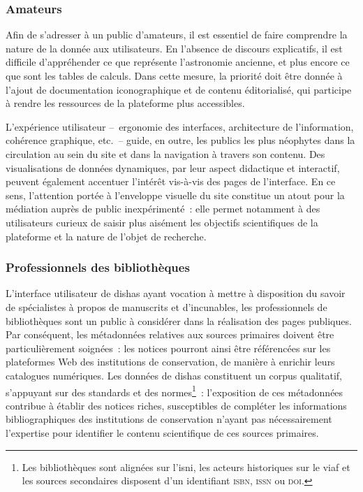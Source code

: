 \documentclass[a4paper,12pt,twoside]{book}
\newcommand{\dishas}{\gls{dishas}\xspace}
\newcommand{\viaf}{\gls{viaf}\xspace}
\newcommand{\isni}{\gls{isni}\xspace}
\begin{document}
			\subsubsection{Amateurs}
Afin de s'adresser à un public d'amateurs, il est essentiel de faire comprendre la nature de la donnée aux utilisateurs. En l'absence de discours explicatifs, il est difficile d'appréhender ce que représente l'astronomie ancienne, et plus encore ce que sont les tables de calculs. Dans cette mesure, la priorité doit être donnée à l'ajout de documentation iconographique et de contenu éditorialisé, qui participe à rendre les ressources de la plateforme plus accessibles.

L'expérience utilisateur –~ergonomie des interfaces, architecture de l'information, cohérence graphique, etc.~– guide, en outre, les publics les plus néophytes dans la circulation au sein du site et dans la navigation à travers son contenu. Des visualisations de données dynamiques, par leur aspect didactique et interactif, peuvent également accentuer l'intérêt vis-à-vis des pages de l'interface. En ce sens, l'attention portée à l'enveloppe visuelle du site constitue un atout pour la médiation auprès de public inexpérimenté~: elle permet notamment à des utilisateurs curieux de saisir plus aisément les objectifs scientifiques de la plateforme et la nature de l'objet de recherche.

			\subsubsection{Professionnels des bibliothèques}
L'interface utilisateur de \dishas ayant vocation à mettre à disposition du savoir de spécialistes à propos de manuscrits et d'incunables, les professionnels de bibliothèques sont un public à considérer dans la réalisation des pages publiques. Par conséquent, les métadonnées relatives aux sources primaires doivent être particulièrement soignées~: les notices pourront ainsi être référencées sur les plateformes Web des institutions de conservation, de manière à enrichir leurs catalogues numériques. Les données de \dishas constituent un corpus qualitatif, s'appuyant sur des standards et des normes\footnote{Les bibliothèques sont alignées sur l'\isni, les acteurs historiques sur le \viaf et les sources secondaires disposent d'un identifiant \textsc{isbn}, \textsc{issn} ou \textsc{doi}.}~: l'exposition de ces métadonnées contribue à établir des notices riches, susceptibles de compléter les informations bibliographiques des institutions de conservation n'ayant pas nécessairement l'expertise pour identifier le contenu scientifique de ces sources primaires.
\end{document}
